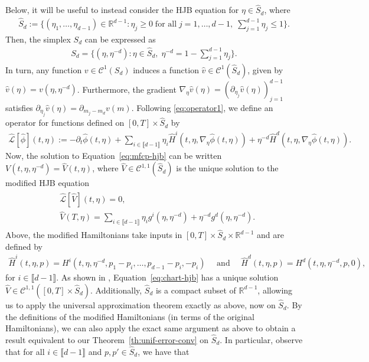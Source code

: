 \documentclass[11pt,reqno]{amsart}
\numberwithin{equation}{section}
\theoremstyle{plain}
\newcommand{\R}{\mathbb{R}}
\newcommand{\sC}{\mathcal{C}}
\newcommand{\sL}{\mathcal{L}}
\newcommand{\lbrs}[1]{\llbracket #1 \rrbracket}
\begin{document}
Below, it will be useful to instead consider the HJB equation for $\eta \in \widehat{S}_d$, where
\begin{align*}
    \widehat{S}_d := \Big\{(\eta_1, \ldots, \eta_{d-1}) \in \R^{d-1} : \eta_j \geq 0 \; \text{for all} \; j = 1,\ldots, d-1, \; \sum_{j=1}^{d-1} \eta_j \leq 1 \Big\}.
\end{align*}
Then, the simplex $S_d$ can be expressed as
\begin{align*}
    S_d = \Big\{(\eta, \eta^{-d}) : \eta \in \widehat{S}_d, \; \eta^{-d} = 1 - \sum_{j=1}^{d-1} \eta_j\Big\}.
\end{align*}
In turn, any function $v \in \sC^1(S_d)$ induces a function $\widehat{v} \in \sC^1(\widehat{S}_d)$, given by $  \widehat{v}(\eta)=v(\eta, \eta^{-d})$. Furthermore, the gradient $\nabla_\eta \widehat{v}(\eta) = (\partial_{\eta_j}\widehat{v}(\eta))_{j=1}^{d-1}$ satisfies $\partial_{\eta_j}\widehat{v}(\eta) = \partial_{m_j - m_d} v(m)$. Following \eqref{eq:operator1}, we define an operator for functions defined on  $[0,T]\times \widehat{S}_d$ by
\begin{align}
\label{eq:mfcp-operator}
    \widehat{\sL}[\widehat{\phi}](t,\eta) := -\partial_t \widehat{\phi}(t, \eta) + \sum_{i \in \lbrs{d-1}} \eta_i \widehat{H}^i(t, \eta, \nabla_\eta \widehat{\phi}(t,\eta)) + \eta^{-d} \widehat{H}^d(t, \eta, \nabla_\eta \widehat{\phi}(t,\eta)).
\end{align}
Now, the solution to Equation~\eqref{eq:mfcp-hjb} can be written $V(t, \eta, \eta^{-d}) = \widehat{V}(t, \eta)$, where $\widehat{V} \in \sC^{1,1}(\widehat{S}_d)$ is the unique solution to the modified HJB equation 
\begin{align}
\label{eq:chart-hjb}
\begin{split}
    &\widehat{\sL}[\widehat{V}](t,\eta)= 0,\\
    &\widehat{V}(T, \eta) = \sum_{i \in \lbrs{d-1}} \eta_i g^i(\eta, \eta^{-d}) + \eta^{-d}g^d(\eta, \eta^{-d}).
\end{split}
\end{align}
Above, the modified Hamiltonians take inputs in $[0, T] \times \widehat{S}_d \times \R^{d-1}$ and are defined by
\begin{align*}
    \widehat{H}^i(t, \eta, p) = H^i(t, \eta, \eta^{-d}, p_1 - p_i, \ldots, p_{d-1} - p_i, -p_{i}) \quad \text{ and } \quad \widehat{H}^d(t, \eta, p) = H^d(t, \eta, \eta^{-d}, p, 0),
\end{align*}
for $i\in\lbrs{d-1}$. 
As shown in \cite{mfcp}, Equation~\eqref{eq:chart-hjb} has a unique solution $\widehat{V} \in \sC^{1,1}([0,T] \times \widehat{S}_d)$. Additionally, $\widehat{S}_d$ is a compact subset of $\R^{d-1}$, allowing us to apply the universal approximation theorem exactly as above, now on $\widehat{S}_d$. By the definitions of the modified Hamiltonians (in terms of the original Hamiltonians), we can also apply the exact same argument as above to obtain a result equivalent to our Theorem~\ref{th:unif-error-conv} on $\widehat{S}_d$. In particular, observe that for all $i \in \lbrs{d-1}$ and $p,p' \in \widehat{S}_d$, we have that
\end{document}
